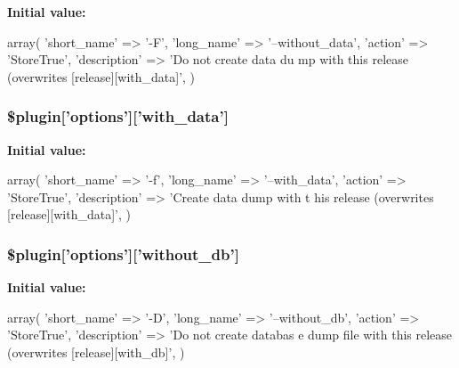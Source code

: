 \label{plugin__release-create_8class_8php_a9238d4fa0d55f1851db6015dacb611a7}
{\bfseries Initial value:}
\begin{DoxyCode}
 array(
                                          'short_name'  => '-F',
                                          'long_name'   => '--without_data',
                                          'action'      => 'StoreTrue',
                                          'description' => 'Do not create data du
      mp with this release (overwrites [release][with_data]',
                                        )
\end{DoxyCode}
\hypertarget{plugin__release-create_8class_8php_aa675b9c634054c778928eff571390ea2}{
\subsubsection[{\$plugin}]{\setlength{\rightskip}{0pt plus 5cm}\$plugin\mbox{[}'options'\mbox{]}\mbox{[}'with\_\-data'\mbox{]}}}
\label{plugin__release-create_8class_8php_aa675b9c634054c778928eff571390ea2}
{\bfseries Initial value:}
\begin{DoxyCode}
 array(
                                        'short_name'  => '-f',
                                        'long_name'   => '--with_data',
                                        'action'      => 'StoreTrue',
                                        'description' => 'Create data dump with t
      his release (overwrites [release][with_data]',
                                      )
\end{DoxyCode}
\hypertarget{plugin__release-create_8class_8php_a86bc0259e2d95a244c343d86849a2fb4}{
\subsubsection[{\$plugin}]{\setlength{\rightskip}{0pt plus 5cm}\$plugin\mbox{[}'options'\mbox{]}\mbox{[}'without\_\-db'\mbox{]}}}
\label{plugin__release-create_8class_8php_a86bc0259e2d95a244c343d86849a2fb4}
{\bfseries Initial value:}
\begin{DoxyCode}
 array(
                                          'short_name'  => '-D',
                                          'long_name'   => '--without_db',
                                          'action'      => 'StoreTrue',
                                          'description' => 'Do not create databas
      e dump file with this release (overwrites [release][with_db]',
                                        )
\end{DoxyCode}
